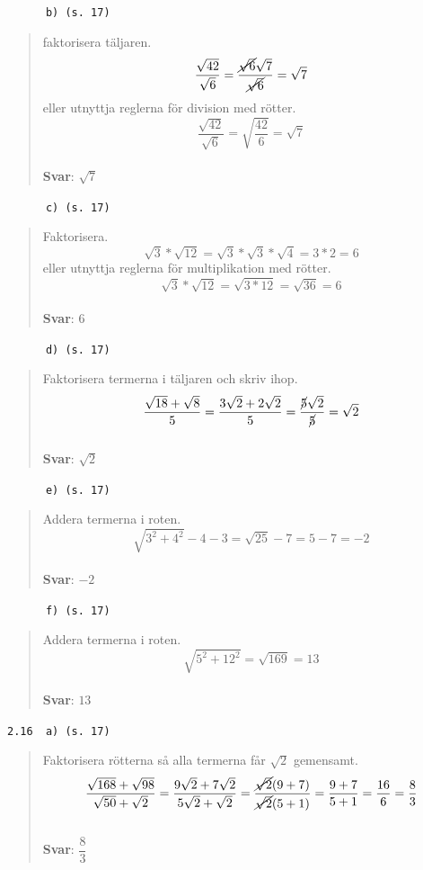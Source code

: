 \documentclass[a4paper]{article}
\newcommand{\tskcol}[1]{\textcolor{tskcol}{#1}}
\begin{document}
	\texttt{\tskcol{~~~~~~b) (s. 17)}}
	\begin{quotation}
		\noindent
		faktorisera täljaren.
		\[\dfrac{\sqrt{42}}{\sqrt{6}}=
		\dfrac{\cancel{\sqrt{6}}\sqrt{7}}{\cancel{\sqrt{6}}}=
		\sqrt{7}\]
		eller utnyttja reglerna för division med rötter.
		\[\dfrac{\sqrt{42}}{\sqrt{6}}=\sqrt{\dfrac{42}{6}}=\sqrt{7}\]
		\\
		\textbf{Svar}: $\sqrt{7}$
	\end{quotation}
	
	\texttt{\tskcol{~~~~~~c) (s. 17)}}
	\begin{quotation}
		\noindent
		Faktorisera.
		\[\sqrt{3}*\sqrt{12}=
		\sqrt{3}*\sqrt{3}*\sqrt{4}=
		3*2=6\]
		eller utnyttja reglerna för multiplikation med rötter.
		\[\sqrt{3}*\sqrt{12}=
		\sqrt{3*12}=
		\sqrt{36}=
		6\]
		\\
		\textbf{Svar}: $6$
	\end{quotation}
	
	\texttt{\tskcol{~~~~~~d) (s. 17)}}
	\begin{quotation}
		\noindent
		Faktorisera termerna i täljaren och skriv ihop.
		\[\dfrac{\sqrt{18}+\sqrt{8}}{5}=
		\dfrac{3\sqrt{2}+2\sqrt{2}}{5}=
		\dfrac{\cancel{5}\sqrt{2}}{\cancel{5}}=
		\sqrt{2}\]
		\\
		\textbf{Svar}: $\sqrt{2}$
	\end{quotation}
	
	\texttt{\tskcol{~~~~~~e) (s. 17)}}
	\begin{quotation}
		\noindent
		Addera termerna i roten.
		\[\sqrt{3^2+4^2}-4-3=
		\sqrt{25}-7=
		5-7=
		-2\]
		\\
		\textbf{Svar}: $-2$
	\end{quotation}
	
	\texttt{\tskcol{~~~~~~f) (s. 17)}}
	\begin{quotation}
		\noindent
		Addera termerna i roten.
		\[\sqrt{5^2+12^2}=\sqrt{169}=13\]
		\\
		\textbf{Svar}: $13$
	\end{quotation}
	
	\texttt{\tskcol{2.16~~a) (s. 17)}}
	\begin{quotation}
		\noindent
		Faktorisera rötterna så alla termerna får $\sqrt{2}$ gemensamt.
		\[\dfrac{\sqrt{168}+\sqrt{98}}{\sqrt{50}+\sqrt{2}}=
		\dfrac{9\sqrt{2}+7\sqrt{2}}{5\sqrt{2}+\sqrt{2}}=
		\dfrac{\cancel{\sqrt{2}}(9+7)}{\cancel{\sqrt{2}}(5+1)}=
		\dfrac{9+7}{5+1}=
		\dfrac{16}{6}=
		\dfrac{8}{3}\]
		\\
		\textbf{Svar}: $\dfrac{8}{3}$
	\end{quotation}
	
\end{document}

